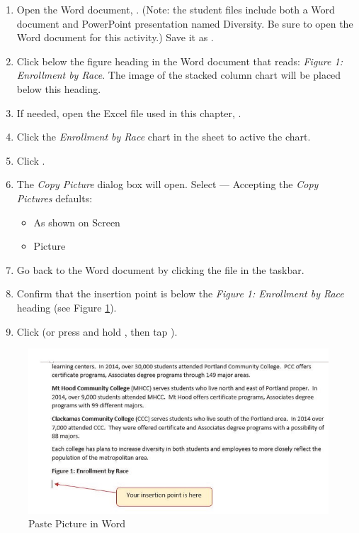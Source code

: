 \begin{enumbox}
	\begin{enumerate}
		\item Open the Word document, . (Note: the student files include both a Word document and PowerPoint presentation named Diversity. Be sure to open the Word document for this activity.) Save it as .
		\item Click below the figure heading in the Word document that reads: \textit{Figure 1: Enrollment by Race}. The image of the stacked column chart will be placed below this heading.
		\item If needed, open the Excel file used in this chapter,  . 
		\item Click the \textit{Enrollment by Race} chart in the  sheet to active the chart.
		\item Click .
		\item The \textit{Copy Picture} dialog box will open. Select  --- Accepting the \textit{Copy Pictures} defaults:
		
		\begin{itemize}
			\item As shown on Screen
			\item Picture
		\end{itemize}	
	
		\item Go back to the  Word document by clicking the file in the taskbar.
		\item Confirm that the insertion point is below the \textit{Figure 1: Enrollment by Race} heading (see Figure \ref{04:fig46}).
		\item Click  (or press and hold , then tap ).
	\end{enumerate}
\end{enumbox}
	
\begin{figure}[H]
	\centering
	\includegraphics[width=\maxwidth{.95\linewidth}]{gfx/ch04_fig46}
	\caption{Paste Picture in Word}
	\label{04:fig46}
\end{figure}


